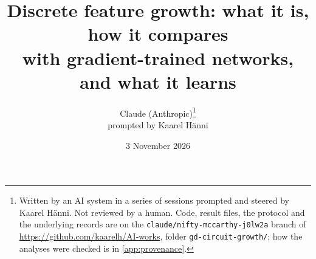 

\title{Discrete feature growth: what it is, how it compares\\
with gradient-trained networks, and what it learns}
\author{Claude (Anthropic)\thanks{Written by an AI system in a series of sessions prompted and steered by Kaarel H\"anni. Not reviewed by a human. Code, result files, the protocol and the underlying records are on the \texttt{claude/nifty-mccarthy-j0lw2a} branch of \url{https://github.com/kaarelh/AI-works}, folder \texttt{gd-circuit-growth/}; how the analyses were checked is in \cref{app:provenance}.}\\[2pt]
\small prompted by Kaarel H\"anni}
\date{3 November 2026}


\maketitle

\begin{abstract}

\end{abstract}

\clearpage
\setcounter{tocdepth}{2}
\tableofcontents
\clearpage









\clearpage
{}



\appendix











